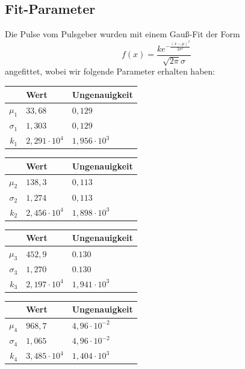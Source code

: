 \documentclass[bigchapter,colorback,accentcolor=tud4b,linedtoc,11pt]{tudreport}
\begin{document}
\color{black}

\subsection{Fit-Parameter}
Die Pulse vom Pulsgeber wurden mit einem Gauß-Fit der Form 
$$f(x)=\frac{k e^{-\frac{(x-\mu )^2}{2 \sigma ^2}}}{\sqrt{2 \pi } \sigma }$$
angefittet, wobei wir folgende Parameter erhalten haben:

\color{blue}
\begin{center}
  \begin{tabular}{r|ll}
               & Wert              & Ungenauigkeit     \\ \hline
    $\mu_1$    & $33,68$           & $0,129$           \\ 
    $\sigma_1$ & $1,303$           & $0,129$           \\ 
    $k_1$      & $2,291\cdot 10^4$ & $1,956\cdot 10^3$ \\ 
  \end{tabular}%
  \quad
  \begin{tabular}{r|ll}
               & Wert              & Ungenauigkeit     \\ \hline
    $\mu_2$    & $138,3$           & $0,113$           \\ 
    $\sigma_2$ & $1,274$           & $0,113$           \\ 
    $k_2$      & $2,456\cdot 10^4$ & $1,898\cdot 10^3$ \\ 
  \end{tabular}%
\end{center}

\begin{center}
  \begin{tabular}{r|ll}
               & Wert              & Ungenauigkeit       \\ \hline
    $\mu_3$    & $452,9$           & $0.130$             \\ 
    $\sigma_3$ & $1,270$           & $0.130$             \\ 
    $k_3$      & $2,197\cdot 10^4$ & $1,941\cdot 10^3$   \\ 
  \end{tabular}%
  \quad
  \begin{tabular}{r|ll}
               & Wert              & Ungenauigkeit       \\ \hline
    $\mu_4$    & $968,7$           & $4,96\cdot 10^{-2}$ \\ 
    $\sigma_4$ & $1,065$           & $4,96\cdot 10^{-2}$ \\ 
    $k_4$      & $3,485\cdot 10^4$ & $1,404\cdot 10^3$   \\ 
  \end{tabular}%
\end{center}
\color{black}
\end{document}
